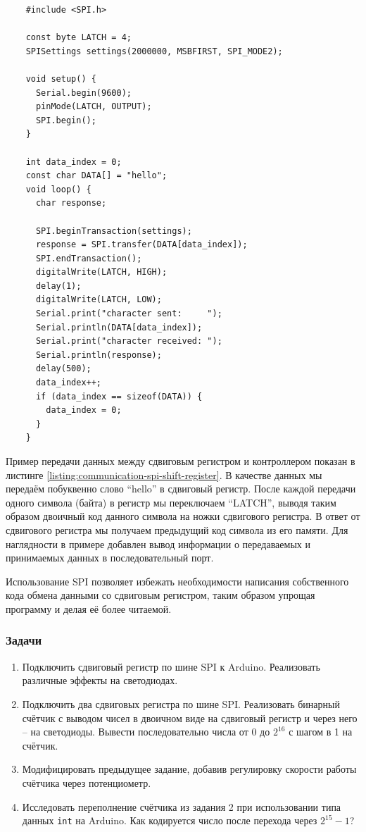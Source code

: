 \documentclass[../sparc.tex]{subfiles}
\begin{document}
\begin{listing}[ht]
  \begin{verbatim}
    #include <SPI.h>

    const byte LATCH = 4;
    SPISettings settings(2000000, MSBFIRST, SPI_MODE2);

    void setup() {
      Serial.begin(9600);
      pinMode(LATCH, OUTPUT);
      SPI.begin();
    }

    int data_index = 0;
    const char DATA[] = "hello";
    void loop() {
      char response;

      SPI.beginTransaction(settings);
      response = SPI.transfer(DATA[data_index]);
      SPI.endTransaction();
      digitalWrite(LATCH, HIGH);
      delay(1);
      digitalWrite(LATCH, LOW);
      Serial.print("character sent:     ");
      Serial.println(DATA[data_index]);
      Serial.print("character received: ");
      Serial.println(response);
      delay(500);
      data_index++;
      if (data_index == sizeof(DATA)) {
        data_index = 0;
      }
    }
  \end{verbatim}
  \label{listing:communication-spi-shift-register}
  \caption{Пример работы со сдвиговым регистром через SPI.}
\end{listing}

Пример передачи данных между сдвиговым регистром и контроллером показан в
листинге \ref{listing:communication-spi-shift-register}.  В качестве данных мы
передаём побуквенно слово ``hello'' в сдвиговый регистр.  После каждой передачи
одного символа (байта) в регистр мы переключаем ``LATCH'', выводя таким образом
двоичный код данного символа на ножки сдвигового регистра.  В ответ от
сдвигового регистра мы получаем предыдущий код символа из его памяти.  Для
наглядности в примере добавлен вывод информации о передаваемых и принимаемых
данных в последовательный порт.

Использование SPI позволяет избежать необходимости написания собственного кода
обмена данными со сдвиговым регистром, таким образом упрощая программу и делая
её более читаемой.

\subsubsection{Задачи}

\begin{enumerate}
\item Подключить сдвиговый регистр по шине SPI к Arduino.  Реализовать различные
  эффекты на светодиодах.
\item Подключить два сдвиговых регистра по шине SPI.  Реализовать бинарный
  счётчик с выводом чисел в двоичном виде на сдвиговый регистр и через него -- на
  светодиоды.  Вывести последовательно числа от 0 до $2^{16}$ с шагом в 1 на
  счётчик.
\item Модифицировать предыдущее задание, добавив регулировку скорости работы
  счётчика через потенциометр.
\item Исследовать переполнение счётчика из задания 2 при использовании типа
  данных \texttt{int} на Arduino.  Как кодируется число после перехода
  через $2^{15} - 1$?
\end{enumerate}
\end{document}
